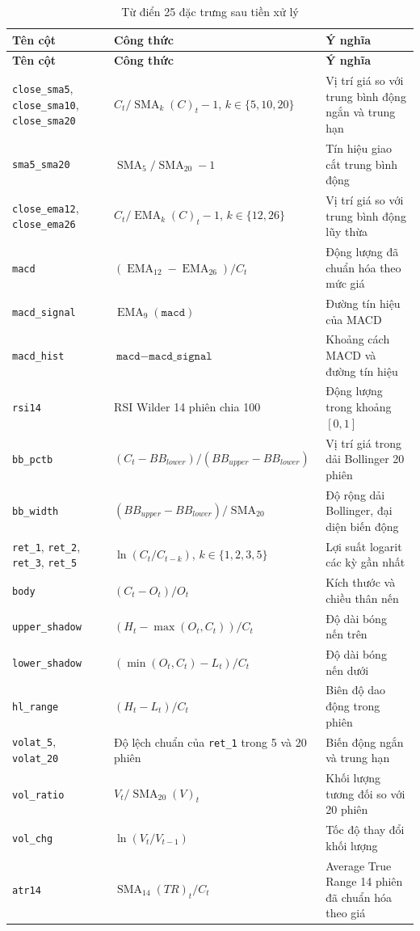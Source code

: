 \documentclass[12pt,a4paper,oneside]{report}
\begin{document}
\begin{longtable}{p{3.2cm} p{5.4cm} p{6.1cm}}
  \caption{Từ điển 25 đặc trưng sau tiền xử lý}\label{tab:tudiendactrung}\\
  \toprule
  \textbf{Tên cột} & \textbf{Công thức} & \textbf{Ý nghĩa} \\
  \midrule
  \endfirsthead
  \toprule
  \textbf{Tên cột} & \textbf{Công thức} & \textbf{Ý nghĩa} \\
  \midrule
  \endhead
  \bottomrule
  \endfoot
  \texttt{close\_sma5}, \texttt{close\_sma10}, \texttt{close\_sma20}
    & $C_t/\operatorname{SMA}_k(C)_t-1$, $k\in\{5,10,20\}$
    & Vị trí giá so với trung bình động ngắn và trung hạn \\
  \texttt{sma5\_sma20} & $\operatorname{SMA}_5/\operatorname{SMA}_{20}-1$
    & Tín hiệu giao cắt trung bình động \\
  \texttt{close\_ema12}, \texttt{close\_ema26}
    & $C_t/\operatorname{EMA}_k(C)_t-1$, $k\in\{12,26\}$
    & Vị trí giá so với trung bình động lũy thừa \\
  \texttt{macd} & $(\operatorname{EMA}_{12}-\operatorname{EMA}_{26})/C_t$
    & Động lượng đã chuẩn hóa theo mức giá \\
  \texttt{macd\_signal} & $\operatorname{EMA}_9(\texttt{macd})$
    & Đường tín hiệu của MACD \\
  \texttt{macd\_hist} & $\texttt{macd}-\texttt{macd\_signal}$
    & Khoảng cách MACD và đường tín hiệu \\
  \texttt{rsi14} & RSI Wilder 14 phiên chia 100
    & Động lượng trong khoảng $[0,1]$ \\
  \texttt{bb\_pctb} & $(C_t-BB_{lower})/(BB_{upper}-BB_{lower})$
    & Vị trí giá trong dải Bollinger 20 phiên \\
  \texttt{bb\_width} & $(BB_{upper}-BB_{lower})/\operatorname{SMA}_{20}$
    & Độ rộng dải Bollinger, đại diện biến động \\
  \texttt{ret\_1}, \texttt{ret\_2}, \texttt{ret\_3}, \texttt{ret\_5}
    & $\ln(C_t/C_{t-k})$, $k\in\{1,2,3,5\}$
    & Lợi suất logarit các kỳ gần nhất \\
  \texttt{body} & $(C_t-O_t)/O_t$
    & Kích thước và chiều thân nến \\
  \texttt{upper\_shadow} & $(H_t-\max(O_t,C_t))/C_t$
    & Độ dài bóng nến trên \\
  \texttt{lower\_shadow} & $(\min(O_t,C_t)-L_t)/C_t$
    & Độ dài bóng nến dưới \\
  \texttt{hl\_range} & $(H_t-L_t)/C_t$
    & Biên độ dao động trong phiên \\
  \texttt{volat\_5}, \texttt{volat\_20}
    & Độ lệch chuẩn của \texttt{ret\_1} trong 5 và 20 phiên
    & Biến động ngắn và trung hạn \\
  \texttt{vol\_ratio} & $V_t/\operatorname{SMA}_{20}(V)_t$
    & Khối lượng tương đối so với 20 phiên \\
  \texttt{vol\_chg} & $\ln(V_t/V_{t-1})$
    & Tốc độ thay đổi khối lượng \\
  \texttt{atr14} & $\operatorname{SMA}_{14}(TR)_t/C_t$
    & Average True Range 14 phiên đã chuẩn hóa theo giá \\
\end{longtable}
\end{document}
